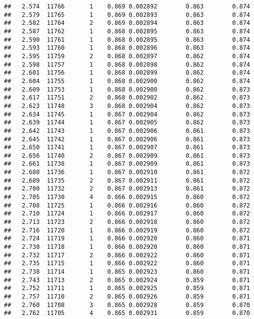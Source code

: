 \documentclass[
]{book}
\begin{document}
\begin{verbatim}
##   2.574  11766       1    0.869 0.002892        0.863        0.874
##   2.579  11765       1    0.869 0.002893        0.863        0.874
##   2.582  11764       2    0.869 0.002894        0.863        0.874
##   2.587  11762       1    0.868 0.002895        0.863        0.874
##   2.590  11761       1    0.868 0.002895        0.863        0.874
##   2.593  11760       1    0.868 0.002896        0.863        0.874
##   2.595  11759       2    0.868 0.002897        0.862        0.874
##   2.598  11757       1    0.868 0.002898        0.862        0.874
##   2.601  11756       1    0.868 0.002899        0.862        0.874
##   2.604  11755       1    0.868 0.002900        0.862        0.874
##   2.609  11753       1    0.868 0.002900        0.862        0.873
##   2.617  11751       2    0.868 0.002902        0.862        0.873
##   2.623  11748       3    0.868 0.002904        0.862        0.873
##   2.634  11745       1    0.867 0.002904        0.862        0.873
##   2.639  11744       1    0.867 0.002905        0.862        0.873
##   2.642  11743       1    0.867 0.002906        0.861        0.873
##   2.645  11742       1    0.867 0.002906        0.861        0.873
##   2.650  11741       1    0.867 0.002907        0.861        0.873
##   2.656  11740       2    0.867 0.002909        0.861        0.873
##   2.661  11738       1    0.867 0.002909        0.861        0.873
##   2.680  11736       1    0.867 0.002910        0.861        0.872
##   2.689  11735       2    0.867 0.002911        0.861        0.872
##   2.700  11732       2    0.867 0.002913        0.861        0.872
##   2.705  11730       4    0.866 0.002915        0.860        0.872
##   2.708  11725       1    0.866 0.002916        0.860        0.872
##   2.710  11724       1    0.866 0.002917        0.860        0.872
##   2.713  11723       2    0.866 0.002918        0.860        0.872
##   2.716  11720       1    0.866 0.002919        0.860        0.872
##   2.724  11719       1    0.866 0.002920        0.860        0.871
##   2.730  11718       1    0.866 0.002920        0.860        0.871
##   2.732  11717       2    0.866 0.002922        0.860        0.871
##   2.735  11715       1    0.866 0.002922        0.860        0.871
##   2.738  11714       1    0.865 0.002923        0.860        0.871
##   2.743  11713       2    0.865 0.002924        0.859        0.871
##   2.752  11711       1    0.865 0.002925        0.859        0.871
##   2.757  11710       2    0.865 0.002926        0.859        0.871
##   2.760  11708       3    0.865 0.002928        0.859        0.870
##   2.762  11705       4    0.865 0.002931        0.859        0.870

\end{verbatim}
\end{document}
